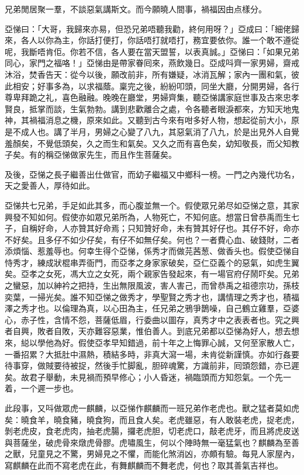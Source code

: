 \documentclass[a5paper, 12pt, openany]{book} %
\begin{document}
	兄弟閒居聚一羣，不談惡氣講斯文。而今願曉人間事，禍福因由点樣分。

	亞悌曰：「大哥，我歸來亦易，但恐兄弟唔聽我勸，終何用呀？」亞成曰：「細佬歸來，各人以你為主，你話打便打，你話唔打就唔打，務宜要依你。誰一个敢不遵從呢，我斷唔肯佢。你若不信，各人要在當天盟誓，以表真誠。」亞悌曰：「如果兄弟同心，家門之福咯！」亞悌由是帶家眷囘來，燕飲幾日。亞成呌齊一家男婦，齋戒沐浴，焚香告天：從今以後，願改前非，所有嫌疑，冰消瓦解；家內一團和氣，彼此相安；好事多為，以求福蔭。稟完之後，紛紛叩頭，同坐大廳，分開男婦，各行尊卑拜跪之礼，喜色融融。晚晚在廳堂，男婦齊集，聽亞悌講家庭世事及古來忠孝賢良，抵掌而談，生氣勃勃。講到悲歡離合之處，令各聽者眼淚都來，方知天地鬼神，其禍福消息之機，原來如此。又聽到古今來有咁多好人物，想起從前大小，原是不成人也。講了半月，男婦之心變了八九，其惡氣消了八九，於是出見外人自覺羞顏矣，不覺低頭矣，久之而生和氣矣。又久之而有喜色矣，幼知敬長，而父知教子矣。有的稱亞悌做家先生，而且作生菩薩矣。

	及後，亞悌之長子繼善出仕做官，而幼子繼福又中鄉科一榜。一門之內幾代功名，天之愛善人，厚待如此。

	亞悌共七兄弟，手足如此其多，而心腹並無一个。假使眾兄弟尽如亞悌之意，其家興發不知如何。假使亦如眾兄弟所為，人物死亡，不知何底。想當日曾恭禹而生七子，自稱好命，人亦贊其好命焉；只知贊好命，未有贊其好仔也。其仔不好，命亦不好矣。且多仔不如少仔矣，有仔不如無仔矣。何也？一者費心血、破錢財，二者添煩惱、惹羞辱也。何幸生得个亞悌，係秀才而做芫茜葱、做香头也。假使亞悌自恃秀才，練成狀棍串弄衙門，而亞孝之身家家破矣，亞仁亞義个的惡氣，如虎生翼矣。亞孝之女死，馮大立之女死，兩个親家告發起來，有一場官府仔鬧吓矣。兄弟之蠻惡，加以紳衿之把持，生出無限風波，害人害己，而曾恭禹之祖德宗功，孫枝奕葉，一掃光矣。誰不知亞悌之做秀才，學聖賢之秀才也，講情理之秀才也，積福澤之秀才也。以倫理為真，以心田為主，任兄弟之鴉爭鵲噪，自己鶴立雞羣，亞婆心，赤子性，含情不怨，菩薩低眉，行委曲以圖存，真秀才中之表表者也。究之興者自興，敗者自敗，天亦難容惡業，惟伯善人。到底兄弟都以亞悌為好人，想去想來，縂以學他為好。假使亞孝早知錯過，前十年之上悔罪心誠，又何至家散人亡，一番招累？大抵肚中濕熱，積結多時，非真大瀉一場，未肯從新謹慎。亦如行姦要待事穿，做賊要待被捉，然後手忙脚亂，胆碎魂驚，方識前非，囘頭怨錯，亦已遲矣。故君子舉動，未見禍而預早修心；小人昏迷，禍臨頭而方知怨氣。一个先一着，一个遲一步也。

	此段事，又呌做眾虎一麒麟，以亞悌作麒麟而一班兄弟作老虎也。獸之猛者莫如虎矣：曉食羊，曉食豬，曉食狗，而且食人矣。老虎雖惡，有人敢裝老虎，捉老虎，剝老虎皮，食老虎肉，抽老虎腸，攞老虎胆，切老虎口，敲老虎牙，而且將虎皮送與菩薩坐，破虎骨來燉虎骨膠。虎嘯風生，何以个陣時無一毫猛氣也？麒麟為至善之獸，兒童見之不驚，男婦見之不懼，而能化煞消凶，亦頗有驗。每見人家屋內，寫麒麟在此而不寫老虎在此，有舞麒麟而不舞老虎，何也？取其善氣吉祥也。
\end{document}
